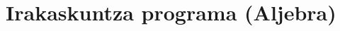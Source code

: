 \documentclass[
 10pt,%
 compress,%
 t,       %
 xcolor=svgnames
]{beamer}
\theoremstyle{definition} \newtheorem{definicion}{Definicion}[section]
\theoremstyle{propiedades} \newtheorem{propiedades}{Propiedades}[section]
\begin{document}




%


%

%



%



\section[Irakaskuntza programa (Aljebra)] {Irakaskuntza programa (Aljebra)}
\end{document}
